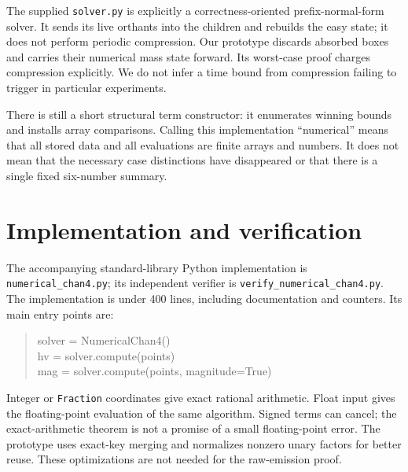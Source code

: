 \documentclass[12pt,a4paper]{article}
\theoremstyle{remark}
\newcommand{\1}{\mathbf1}
\begin{document}
The supplied \texttt{solver.py} is explicitly a correctness-oriented
prefix-normal-form solver. It sends its live orthants into the children
and rebuilds the easy state; it does not perform periodic compression.
Our prototype discards absorbed boxes and carries their numerical mass
state forward. Its worst-case proof charges compression explicitly.
We do not infer a time bound from compression failing to trigger in
particular experiments.

There is still a short structural term constructor: it enumerates winning
bounds and installs array comparisons. Calling this implementation
``numerical'' means that all stored data and all evaluations are finite
arrays and numbers. It does not mean that the necessary case distinctions
have disappeared or that there is a single fixed six-number summary.

\section{Implementation and verification}\label{sec:validation}
The accompanying standard-library Python implementation is
\texttt{numerical\_chan4.py}; its independent verifier is
\texttt{verify\_numerical\_chan4.py}. The implementation is under 400 lines,
including documentation and counters. Its main entry points are:
\begin{quote}\ttfamily\small
solver = NumericalChan4()\\
hv = solver.compute(points)\\
mag = solver.compute(points, magnitude=True)
\end{quote}
Integer or \texttt{Fraction} coordinates give exact rational arithmetic.
Float input gives the floating-point evaluation of the same algorithm.
Signed terms can cancel; the exact-arithmetic theorem is not a promise
of a small floating-point error. The prototype uses exact-key merging and
normalizes nonzero unary factors for better reuse. These optimizations are
not needed for the raw-emission proof.
\end{document}
